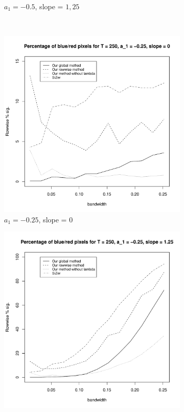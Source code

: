\documentclass[a4paper,12pt]{article}
\begin{document}
\begin{figure}[t!]
\begin{subfigure}[b]{0.475\textwidth}
\caption{$a_1 = -0.5$, slope = $1,25$}
\end{subfigure}\\
\begin{subfigure}[b]{0.475\textwidth}
\includegraphics[width=\textwidth]{Plots/rowwise_sig_comparison_T_250_a1_-25_slope_0.pdf}
\caption{$a_1 = -0.25$, slope = $0$}
\end{subfigure}\hspace{0.25cm}
\begin{subfigure}[b]{0.475\textwidth}
\includegraphics[width=\textwidth]{Plots/rowwise_sig_comparison_T_250_a1_-25_slope_125.pdf}

\end{subfigure}
\end{figure}
\end{document}
